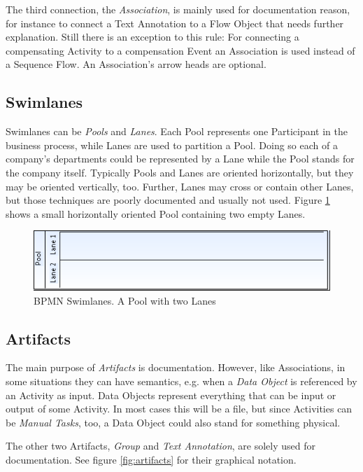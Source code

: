 The third connection, the \emph{Association}, is mainly used for documentation
reason, for instance to connect a Text Annotation to a Flow Object that needs
further explanation.  Still there is an exception to this rule: For connecting a
compensating Activity to a compensation Event an Association is used instead of
a Sequence Flow.  An Association's arrow heads are optional.


\subsection{Swimlanes}

Swimlanes can be \emph{Pools} and \emph{Lanes}.  Each Pool represents one
Participant in the business process, while Lanes are used to partition a Pool.
Doing so each of a company's departments could be represented by a Lane while the
Pool stands for the company itself.  Typically Pools and Lanes are oriented
horizontally, but they may be oriented vertically, too.  Further, Lanes may cross
or contain other Lanes, but those techniques are poorly documented and usually
not used.  Figure \ref{fig:swimlanes} shows a small horizontally oriented Pool
containing two empty Lanes.

\begin{figure}[ht]
	\centering
	\includegraphics[width=.75\textwidth]{figures/bpmn/swimlanes.png}
	\caption[BPMN Swimlanes]{BPMN Swimlanes. A Pool with two Lanes}
	\label{fig:swimlanes}
\end{figure}


\subsection{Artifacts}

The main purpose of \emph{Artifacts} is documentation.  However, like Associations,
in some situations they can have semantics, e.g. when a \emph{Data Object} is
referenced by an Activity as input.  Data Objects represent everything that can
be input or output of some Activity.  In most cases this will be a file, but since
Activities can be \emph{Manual Tasks}, too, a Data Object could also stand for
something physical.

The other two Artifacts, \emph{Group} and \emph{Text Annotation}, are solely used
for documentation.  See figure \ref{fig:artifacts} for their graphical notation.

